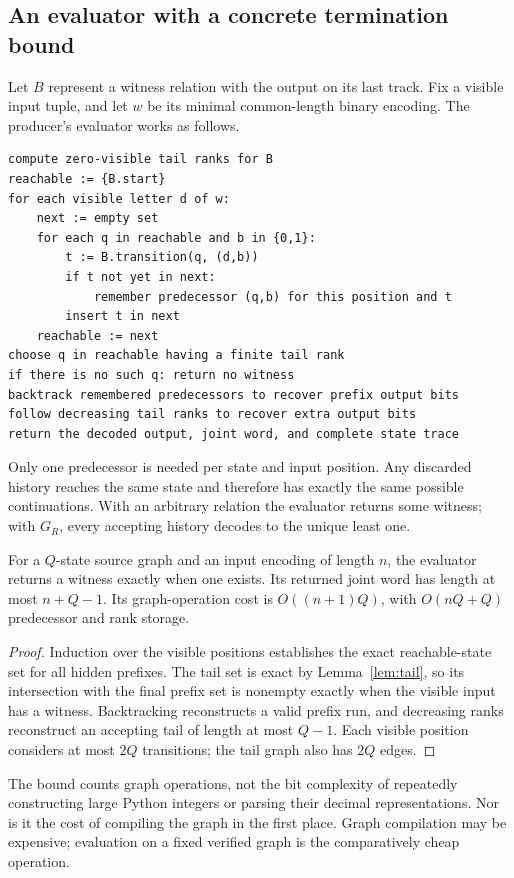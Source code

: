 \subsection{An evaluator with a concrete termination bound}
Let \(B\) represent a witness relation with the output on its last track. Fix a visible input tuple, and let \(w\) be its minimal common-length binary encoding. The producer's evaluator works as follows.
\begin{lstlisting}
compute zero-visible tail ranks for B
reachable := {B.start}
for each visible letter d of w:
    next := empty set
    for each q in reachable and b in {0,1}:
        t := B.transition(q, (d,b))
        if t not yet in next:
            remember predecessor (q,b) for this position and t
        insert t in next
    reachable := next
choose q in reachable having a finite tail rank
if there is no such q: return no witness
backtrack remembered predecessors to recover prefix output bits
follow decreasing tail ranks to recover extra output bits
return the decoded output, joint word, and complete state trace
\end{lstlisting}
Only one predecessor is needed per state and input position. Any discarded history reaches the same state and therefore has exactly the same possible continuations. With an arbitrary relation the evaluator returns some witness; with \(G_R\), every accepting history decodes to the unique least one.

\begin{proposition}\label{prop:evaluator}
For a \(Q\)-state source graph and an input encoding of length \(n\), the evaluator returns a witness exactly when one exists. Its returned joint word has length at most \(n+Q-1\). Its graph-operation cost is \(O((n+1)Q)\), with \(O(nQ+Q)\) predecessor and rank storage.
\end{proposition}
\begin{proof}
Induction over the visible positions establishes the exact reachable-state set for all hidden prefixes. The tail set is exact by Lemma~\ref{lem:tail}, so its intersection with the final prefix set is nonempty exactly when the visible input has a witness. Backtracking reconstructs a valid prefix run, and decreasing ranks reconstruct an accepting tail of length at most \(Q-1\). Each visible position considers at most \(2Q\) transitions; the tail graph also has \(2Q\) edges.
\end{proof}

The bound counts graph operations, not the bit complexity of repeatedly constructing large Python integers or parsing their decimal representations. Nor is it the cost of compiling the graph in the first place. Graph compilation may be expensive; evaluation on a fixed verified graph is the comparatively cheap operation.

